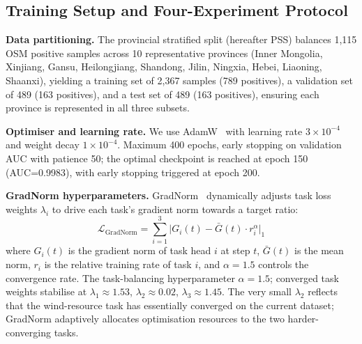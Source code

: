 \documentclass[12pt, a4paper]{article}
\begin{document}
\subsection{Training Setup and Four-Experiment Protocol}
\label{sec:methods_proto}
\label{sec:training}

\textbf{Data partitioning.}
The provincial stratified split (hereafter PSS) balances 1,115 OSM positive samples
across 10 representative provinces (Inner Mongolia, Xinjiang,
Gansu, Heilongjiang, Shandong, Jilin, Ningxia, Hebei,
Liaoning, Shaanxi), yielding a training set of 2,367 samples
(789 positives), a validation set of 489 (163 positives),
and a test set of 489 (163 positives), ensuring each province
is represented in all three subsets.

\textbf{Optimiser and learning rate.}
We use AdamW~\cite{loshchilov2019} with learning rate
$3\times10^{-4}$ and weight decay $1\times10^{-4}$. Maximum
400 epochs, early stopping on validation AUC with patience 50;
the optimal checkpoint is reached at epoch 150
(AUC=0.9983), with early stopping triggered at epoch 200.

\textbf{GradNorm hyperparameters.}
GradNorm~\cite{chen2018gradnorm,zhang2017mtl} dynamically adjusts task loss
weights $\lambda_i$ to drive each task's gradient norm towards
a target ratio:
\begin{equation}
\mathcal{L}_{\text{GradNorm}} = \sum_{i=1}^{3}
\bigl|G_i(t) - \bar{G}(t)\cdot r_i^\alpha\bigr|_1
\label{eq:gradnorm}
\end{equation}
where $G_i(t)$ is the gradient norm of task head $i$ at step
$t$, $\bar{G}(t)$ is the mean norm, $r_i$ is the relative
training rate of task $i$, and $\alpha=1.5$ controls the
convergence rate. The task-balancing hyperparameter $\alpha=1.5$; converged
task weights stabilise at $\lambda_1\approx1.53$,
$\lambda_2\approx0.02$, $\lambda_3\approx1.45$. The very
small $\lambda_2$ reflects that the wind-resource task has
essentially converged on the current dataset; GradNorm
adaptively allocates optimisation resources to the two
harder-converging tasks.
\end{document}
